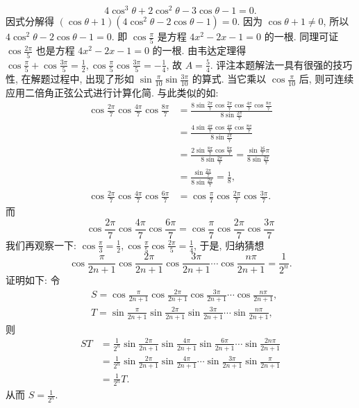 $$
4 \cos ^3 \theta+2 \cos ^2 \theta-3 \cos \theta-1=0 .
$$
因式分解得 $(\cos \theta+1)\left(4 \cos ^2 \theta-2 \cos \theta-1\right)=0$.
因为 $\cos \theta+1 \neq 0$, 所以 $4 \cos ^2 \theta-2 \cos \theta-1=0$. 即 $\cos \frac{\pi}{5}$ 是方程 $4 x^2- 2 x-1=0$ 的一根.
同理可证 $\cos \frac{2 \pi}{5}$ 也是方程 $4 x^2-2 x-1=0$ 的一根.
由韦达定理得 $\cos \frac{\pi}{5}+\cos \frac{3 \pi}{5}=\frac{1}{2}, \cos \frac{\pi}{5} \cos \frac{3 \pi}{5}=-\frac{1}{4}$, 故 $A=\frac{5}{4}$.
评注本题解法一具有很强的技巧性, 在解题过程中, 出现了形如 $\sin \frac{\pi}{10} \sin \frac{3 \pi}{10}$ 的算式.
当它乘以 $\cos \frac{\pi}{10}$ 后, 则可连续应用二倍角正弦公式进行计算化简.
与此类似的如:
$$
\begin{aligned}
\cos \frac{2 \pi}{7} \cos \frac{4 \pi}{7} \cos \frac{8 \pi}{7} & =\frac{8 \sin \frac{2 \pi}{7} \cos \frac{2 \pi}{7} \cos \frac{4 \pi}{7} \cos \frac{8 \pi}{7}}{8 \sin \frac{2 \pi}{7}} \\
& =\frac{4 \sin \frac{4 \pi}{7} \cos \frac{4 \pi}{7} \cos \frac{8 \pi}{7}}{8 \sin \frac{2 \pi}{7}} \\
& =\frac{2 \sin \frac{8 \pi}{7} \cos \frac{8 \pi}{7}}{8 \sin \frac{2 \pi}{7}}=\frac{\sin \frac{16}{7} \pi}{8 \sin \frac{2 \pi}{7}} \\
& =\frac{\sin \frac{2 \pi}{7}}{8 \sin \frac{2 \pi}{7}}=\frac{1}{8}, \\
\cos \frac{2 \pi}{7} \cos \frac{4 \pi}{7} \cos \frac{6 \pi}{7} & =\cos \frac{\pi}{7} \cos \frac{2 \pi}{7} \cos \frac{3 \pi}{7} .
\end{aligned}
$$
而
$$
\cos \frac{2 \pi}{7} \cos \frac{4 \pi}{7} \cos \frac{6 \pi}{7}=\cos \frac{\pi}{7} \cos \frac{2 \pi}{7} \cos \frac{3 \pi}{7}
$$
我们再观察一下: $\cos \frac{\pi}{3}=\frac{1}{2}, \cos \frac{\pi}{5} \cos \frac{2 \pi}{5}=\frac{1}{4}$, 于是, 归纳猜想
$$
\cos \frac{\pi}{2 n+1} \cos \frac{2 \pi}{2 n+1} \cos \frac{3 \pi}{2 n+1} \cdots \cos \frac{n \pi}{2 n+1}=\frac{1}{2^n} .
$$
证明如下: 令
$$
\begin{aligned}
& S=\cos \frac{\pi}{2 n+1} \cos \frac{2 \pi}{2 n+1} \cos \frac{3 \pi}{2 n+1} \cdots \cos \frac{n \pi}{2 n+1}, \\
& T=\sin \frac{\pi}{2 n+1} \sin \frac{2 \pi}{2 n+1} \sin \frac{3 \pi}{2 n+1} \cdots \sin \frac{n \pi}{2 n+1},
\end{aligned}
$$
则
$$
\begin{aligned}
S T & =\frac{1}{2^n} \sin \frac{2 \pi}{2 n+1} \sin \frac{4 \pi}{2 n+1} \sin \frac{6 \pi}{2 n+1} \cdots \sin \frac{2 n \pi}{2 n+1} \\
& =\frac{1}{2^n} \sin \frac{2 \pi}{2 n+1} \sin \frac{4 \pi}{2 n+1} \cdots \sin \frac{3 \pi}{2 n+1} \sin \frac{\pi}{2 n+1} \\
& =\frac{1}{2^n} T .
\end{aligned}
$$
从而 $S=\frac{1}{2^n}$.



